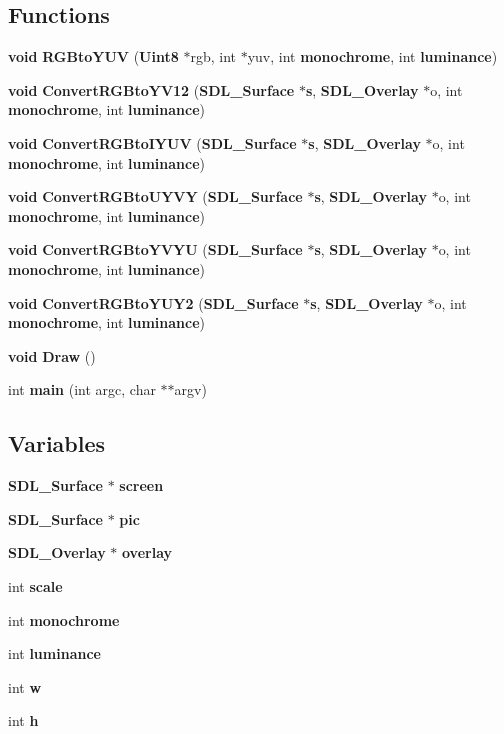 \subsection*{Functions}
\begin{DoxyCompactItemize}
\item 
{\bf void} {\bf R\+G\+Bto\+Y\+U\+V} ({\bf Uint8} $\ast$rgb, int $\ast$yuv, int {\bf monochrome}, int {\bf luminance})
\item 
{\bf void} {\bf Convert\+R\+G\+Bto\+Y\+V12} ({\bf S\+D\+L\+\_\+\+Surface} $\ast${\bf s}, {\bf S\+D\+L\+\_\+\+Overlay} $\ast$o, int {\bf monochrome}, int {\bf luminance})
\item 
{\bf void} {\bf Convert\+R\+G\+Bto\+I\+Y\+U\+V} ({\bf S\+D\+L\+\_\+\+Surface} $\ast${\bf s}, {\bf S\+D\+L\+\_\+\+Overlay} $\ast$o, int {\bf monochrome}, int {\bf luminance})
\item 
{\bf void} {\bf Convert\+R\+G\+Bto\+U\+Y\+V\+Y} ({\bf S\+D\+L\+\_\+\+Surface} $\ast${\bf s}, {\bf S\+D\+L\+\_\+\+Overlay} $\ast$o, int {\bf monochrome}, int {\bf luminance})
\item 
{\bf void} {\bf Convert\+R\+G\+Bto\+Y\+V\+Y\+U} ({\bf S\+D\+L\+\_\+\+Surface} $\ast${\bf s}, {\bf S\+D\+L\+\_\+\+Overlay} $\ast$o, int {\bf monochrome}, int {\bf luminance})
\item 
{\bf void} {\bf Convert\+R\+G\+Bto\+Y\+U\+Y2} ({\bf S\+D\+L\+\_\+\+Surface} $\ast${\bf s}, {\bf S\+D\+L\+\_\+\+Overlay} $\ast$o, int {\bf monochrome}, int {\bf luminance})
\item 
{\bf void} {\bf Draw} ()
\item 
int {\bf main} (int argc, char $\ast$$\ast$argv)
\end{DoxyCompactItemize}
\subsection*{Variables}
\begin{DoxyCompactItemize}
\item 
{\bf S\+D\+L\+\_\+\+Surface} $\ast$ {\bf screen}
\item 
{\bf S\+D\+L\+\_\+\+Surface} $\ast$ {\bf pic}
\item 
{\bf S\+D\+L\+\_\+\+Overlay} $\ast$ {\bf overlay}
\item 
int {\bf scale}
\item 
int {\bf monochrome}
\item 
int {\bf luminance}
\item 
int {\bf w}
\item 
int {\bf h}
\end{DoxyCompactItemize}


